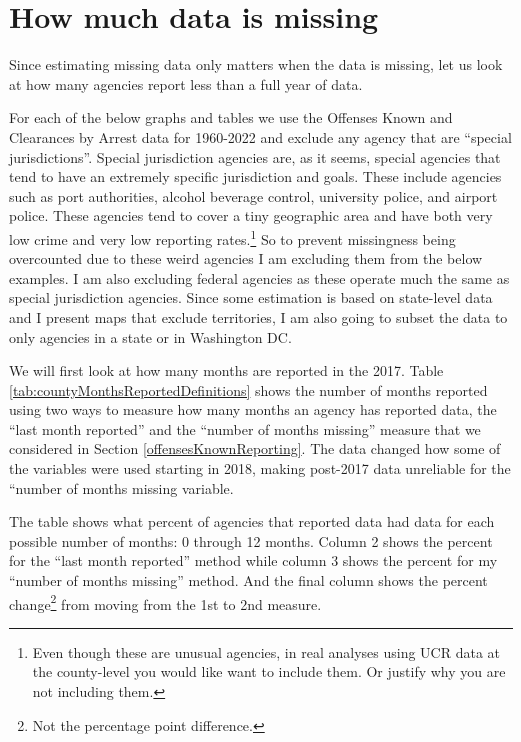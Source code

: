 \documentclass[
]{krantz}
\begin{document}
\section{How much data is
missing}\label{how-much-data-is-missing}

Since estimating missing data only matters when the data is
missing, let us look at how many agencies report less than a
full year of data.

For each of the below graphs and tables we use the Offenses
Known and Clearances by Arrest data for 1960-2022 and
exclude any agency that are ``special jurisdictions''.
Special jurisdiction agencies are, as it seems, special
agencies that tend to have an extremely specific
jurisdiction and goals. These include agencies such as port
authorities, alcohol beverage control, university police,
and airport police. These agencies tend to cover a tiny
geographic area and have both very low crime and very low
reporting rates.\footnote{Even though these are unusual
  agencies, in real analyses using UCR data at the
  county-level you would like want to include them. Or
  justify why you are not including them.} So to prevent
missingness being overcounted due to these weird agencies I
am excluding them from the below examples. I am also
excluding federal agencies as these operate much the same as
special jurisdiction agencies. Since some estimation is
based on state-level data and I present maps that exclude
territories, I am also going to subset the data to only
agencies in a state or in Washington DC.

We will first look at how many months are reported in the
2017. Table \ref{tab:countyMonthsReportedDefinitions} shows
the number of months reported using two ways to measure how
many months an agency has reported data, the ``last month
reported'' and the ``number of months missing'' measure that
we considered in Section \ref{offensesKnownReporting}. The
data changed how some of the variables were used starting in
2018, making post-2017 data unreliable for the ``number of
months missing variable.

The table shows what percent of agencies that reported data
had data for each possible number of months: 0 through 12
months. Column 2 shows the percent for the ``last month
reported'' method while column 3 shows the percent for my
``number of months missing'' method. And the final column
shows the percent change\footnote{Not the percentage point
  difference.} from moving from the 1st to 2nd measure.
\end{document}
